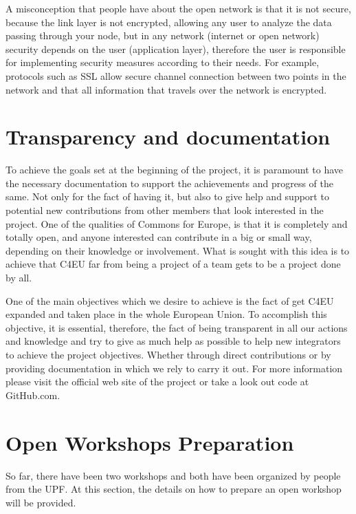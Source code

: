 \documentclass[draftclsnofoot,12pt,journal,onecolumn]{IEEEtran}
\begin{document}
A misconception that people have about the open network is that it is not secure, because the link layer is not encrypted, allowing any user to analyze the data passing through your node, but in any network (internet or open network) security depends on the user (application layer), therefore the user is responsible for implementing security measures according to their needs. For example, protocols such as SSL allow secure channel connection between two points in the network and that all information that travels over the network is encrypted.


\section{Transparency and documentation}
\label{sec:documentation}

To achieve the goals set at the beginning of the project, it is paramount to have the necessary documentation to support the achievements and progress of the same. Not only for the fact of having it, but also to give help and support to potential new contributions from other members that look interested in the project. One of the qualities of Commons for Europe, is that it is completely and totally open, and anyone interested can contribute in a big or small way, depending on their knowledge or involvement. What is sought with this idea is to achieve that C4EU far from being a project of a team gets to be a project done by all.

One of the main objectives which we desire to achieve is the fact of get C4EU expanded and taken place in the whole European Union. To accomplish this objective, it is essential, therefore, the fact of being transparent in all our actions and knowledge and try to give as much help as possible to help new integrators to achieve the project objectives. Whether through direct contributions or by providing documentation in which we rely to carry it out. For more information please visit the official web site of the project or take a look out code at GitHub.com.


\section{Open Workshops Preparation}
\label{sec:workshops}

So far, there have been two workshops and both have been organized by people from the UPF. At this section, the details on how to prepare an open workshop will be provided.
\end{document}
